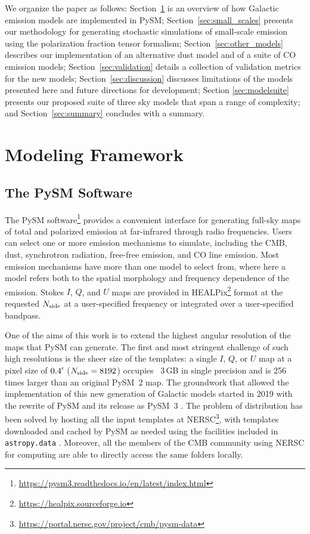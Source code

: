 \documentclass[twocolumn]{aastex631}
\begin{document}
We organize the paper as follows: Section~\ref{sec:methods} is an overview of how Galactic emission models are implemented in PySM; Section~\ref{sec:small_scales} presents our methodology for generating stochastic simulations of small-scale emission using the polarization fraction tensor formalism; Section~\ref{sec:other_models} describes our implementation of an alternative dust model and of a suite of CO emission models; Section~\ref{sec:validation} details a collection of validation metrics for the new models; Section~\ref{sec:discussion} discusses limitations of the models presented here and future directions for development; Section \ref{sec:modelsuite} presents our proposed suite of three sky models that span a range of complexity; and Section~\ref{sec:summary} concludes with a summary.

\section{Modeling Framework} \label{sec:methods}

\subsection{The PySM Software}
The PySM software\footnote{\url{https://pysm3.readthedocs.io/en/latest/index.html}} provides a convenient interface for generating full-sky maps of total and polarized emission at far-infrared through radio frequencies. Users can select one or more emission mechanisms to simulate, including the CMB, dust, synchrotron radiation, free-free emission, and CO line emission. Most emission mechanisms have more than one model to select from, where here a model refers both to the spatial morphology and frequency dependence of the emission. Stokes $I$, $Q$, and $U$ maps are provided in HEALPix\footnote{\url{https://healpix.sourceforge.io}}  \citep{Gorski:2005} format at the requested $N_{\rm side}$ at a user-specified frequency or integrated over a user-specified bandpass.

One of the aims of this work is to extend the highest angular resolution of the maps that PySM can generate. The first and most stringent challenge of such high resolutions is the sheer size of the templates: a single $I$, $Q$, or $U$ map at a pixel size of $0.4\mbox{$^\prime$}$ ($N_{\rm side}=8192$) occupies ~3\,GB in single precision and is 256 times larger than an original PySM~2 map. The groundwork that allowed the implementation of this new generation of Galactic models started in 2019 with the rewrite of PySM and its release as PySM~3 \citep[see][for details]{Zonca:2021}. The problem of distribution has been solved by hosting all the input templates at NERSC\footnote{\url{https://portal.nersc.gov/project/cmb/pysm-data}}, with templates downloaded and cached by PySM as needed using the facilities included in \texttt{astropy.data} \citep{AstropyCollaboration:2013, AstropyCollaboration:2018}. Moreover, all the members of the CMB community using NERSC for computing are able to directly access the same folders locally.
\end{document}
